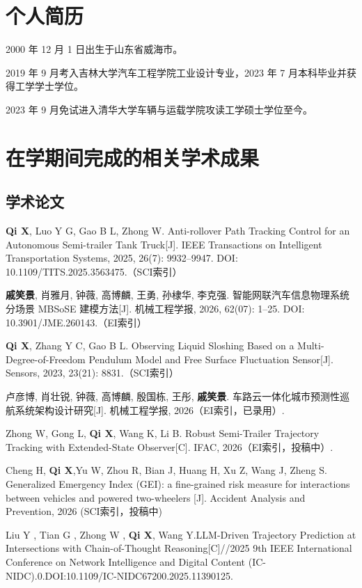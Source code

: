 
\begin{resume}

  \section*{个人简历}

  2000 年 12 月 1 日出生于山东省威海市。

  2019 年 9 月考入吉林大学汽车工程学院工业设计专业，2023 年 7 月本科毕业并获得工学学士学位。

  2023 年 9 月免试进入清华大学车辆与运载学院攻读工学硕士学位至今。


  \section*{在学期间完成的相关学术成果}

  \subsection*{学术论文}

  \begin{achievements}
    \item \textbf{Qi X}, Luo Y G, Gao B L, Zhong W. Anti-rollover Path Tracking Control for an Autonomous Semi-trailer Tank Truck[J]. IEEE Transactions on Intelligent Transportation Systems, 2025, 26(7): 9932--9947. DOI: 10.1109/TITS.2025.3563475.（SCI索引）
    \item \textbf{戚笑景}, 肖雅月, 钟薇, 高博麟, 王勇, 孙棣华, 李克强. 智能网联汽车信息物理系统分场景 MBSoSE 建模方法[J]. 机械工程学报, 2026, 62(07): 1--25. DOI: 10.3901/JME.260143.（EI索引）
    \item \textbf{Qi X}, Zhang Y C, Gao B L. Observing Liquid Sloshing Based on a Multi-Degree-of-Freedom Pendulum Model and Free Surface Fluctuation Sensor[J]. Sensors, 2023, 23(21): 8831.（SCI索引）
    \item 卢彦博, 肖壮锐, 钟薇, 高博麟, 殷国栋, 王彤, \textbf{戚笑景}. 车路云一体化城市预测性巡航系统架构设计研究[J]. 机械工程学报, 2026（EI索引，已录用）.
    \item Zhong W, Gong L, \textbf{Qi X}, Wang K, Li B. Robust Semi-Trailer Trajectory Tracking with Extended-State Observer[C]. IFAC, 2026（EI索引，投稿中）.
    \item Cheng H, \textbf{Qi X},Yu W, Zhou R, Bian J, Huang H, Xu Z, Wang J, Zheng S. Generalized Emergency Index (GEI): a fine-grained risk measure for interactions between vehicles and powered two-wheelers [J]. Accident Analysis and Prevention, 2026 (SCI索引，投稿中)
    \item Liu Y , Tian G , Zhong W , \textbf{Qi X}, Wang Y.LLM-Driven Trajectory Prediction at Intersections with Chain-of-Thought Reasoning[C]//2025 9th IEEE International Conference on Network Intelligence and Digital Content (IC-NIDC).0.DOI:10.1109/IC-NIDC67200.2025.11390125.
  \end{achievements}



\end{resume}
